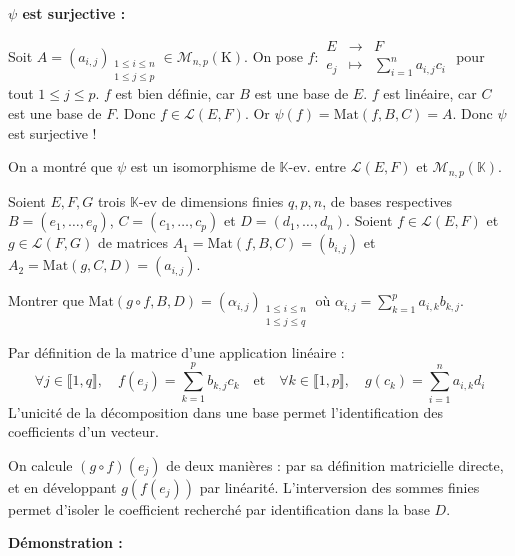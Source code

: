 \documentclass[11pt, a4paper]{article}
\theoremstyle{definition}
\begin{document}
\textbf{$\psi$ est surjective :}
\begin{outline}
	\1 Soit $A = (a_{i,j})_{\substack{1 \le i \le n\\ 1 \le j \le p}} \in \mathcal M_{n,p}(\mathrm{K})$.
	\1 On pose $f : \begin{matrix} E &\to &F \\ e_j &\mapsto &\sum_{i=1}^n a_{i,j} c_i \end{matrix}$ pour tout $1 \le j \le p$.
	\1 $f$ est bien définie, car $B$ est une base de $E$.
	\1 $f$ est linéaire, car $C$ est une base de $F$.
	\1 Donc $f \in \mathcal L(E,F)$.
	\1 Or $\psi(f) = \mathrm{Mat}(f,B,C) = A$.
	\1 Donc $\psi$ est surjective !
\end{outline}
On a montré que $\psi$ est un isomorphisme de $\mathbb{K}$-ev. entre $\mathcal L(E,F)$ et $\mathcal M_{n,p}(\mathbb{K})$.

\clearpage 

\begin{tcolorbox}[instructionstyle]
Soient $E, F, G$ trois $\mathbb{K}$-ev de dimensions finies $q, p, n$, de bases respectives $B = (e_1,\dots,e_q)$, $C = (c_1,\dots,c_p)$ et $D = (d_1,\dots,d_n)$.
Soient $f \in \mathcal L(E,F)$ et $g \in \mathcal L(F,G)$ de matrices $A_1 = \mathrm{Mat}(f,B,C) = (b_{i,j})$ et $A_2 = \mathrm{Mat}(g,C,D) = (a_{i,j})$.

Montrer que $\mathrm{Mat}(g \circ f, B, D) = (\alpha_{i,j})_{\substack{1 \le i \le n \\ 1 \le j \le q}}$ où $\alpha_{i,j} = \sum_{k=1}^p a_{i,k} b_{k,j}$.
\end{tcolorbox}

\begin{rappel}
Par définition de la matrice d'une application linéaire :
$$\forall j \in \llbracket 1,q \rrbracket, \quad f(e_j) = \sum_{k=1}^p b_{k,j} c_k \quad \text{et} \quad \forall k \in \llbracket 1,p \rrbracket, \quad g(c_k) = \sum_{i=1}^n a_{i,k} d_i$$
L'unicité de la décomposition dans une base permet l'identification des coefficients d'un vecteur.
\end{rappel}

\begin{tcolorbox}[methodstyle]
On calcule $(g \circ f)(e_j)$ de deux manières : par sa définition matricielle directe, et en développant $g(f(e_j))$ par linéarité. L'interversion des sommes finies permet d'isoler le coefficient recherché par identification dans la base $D$.
\end{tcolorbox}

\vspace{0.4cm}
\textbf{Démonstration :}
\end{document}
